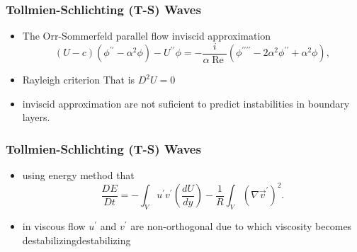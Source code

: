 \documentclass[aspectratio=149]{beamer}
\begin{document}
\begin{frame}
\frametitle{Tollmien-Schlichting (T-S) Waves}
    \begin{itemize}
        \item The Orr-Sommerfeld parallel flow inviscid approximation
  \begin{equation}
    (U-c)\left(\phi^{\prime \prime}-\alpha^{2} \phi\right)-U^{\prime \prime}
    \phi=-\frac{i}{\alpha \operatorname{Re}}\left(\phi^{\prime \prime \prime
    \prime}-2 \alpha^{2} \phi^{\prime \prime}+\alpha^{2} \phi\right),
    \label{eq:os}
  \end{equation}

        \item Rayleigh criterion That is $D^2U = 0$
        \item inviscid approximation are not suficient to predict
          instabilities in boundary layers.
    \end{itemize}
\end{frame}

\begin{frame}
\frametitle{Tollmien-Schlichting (T-S) Waves}
    \begin{itemize}
        \item using energy method that
  \begin{equation}
   \frac{D E}{D t}=-\int_{V} u^{\prime} v^{\prime}\left(\frac{d U}{d
   y}\right)-\frac{1}{R} \int_{V}\left(\nabla \vec{v}^{\prime}\right)^{2}.
    \label{eq:energy}
  \end{equation}
        \item in viscous flow $u^{'}$ and $v^{'}$ are non-orthogonal due
          to which viscosity becomes destabilizingdestabilizing
    \end{itemize}
\end{frame}
\end{document}
